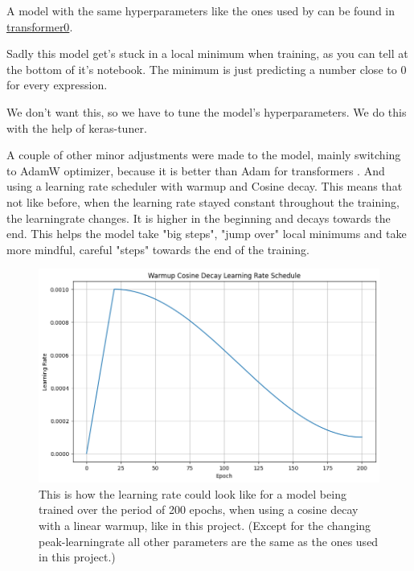 \documentclass{article}
\begin{document}
A model with the same hyperparameters like the ones used by \cite{vaswani2023attentionneed} 
can be found in \href{https://github.com/AntonStantan/matura/blob/main/transformer/transformer0.ipynb}
{transformer0}.

Sadly this model get's stuck in a local minimum when training, as you can 
tell at the bottom of it's notebook. The minimum is just predicting a number 
close to 0 for every expression.

We don't want this, so we have to tune the model's hyperparameters.
We do this with the help of keras-tuner. 

A couple of other minor adjustments were made to the model, mainly switching to 
AdamW optimizer, because it is better than Adam for transformers \cite{loshchilov2019decoupledweightdecayregularization}. 
And using a learning rate scheduler with warmup and Cosine decay. This means 
that not like before, when the learning rate stayed constant throughout the 
training, the learningrate changes. It is higher in the beginning and decays 
towards the end. This helps the model take "big steps", "jump over" local 
minimums and take more mindful, careful "steps" towards the end of the training. 

\begin{figure}[htbp]
    \centering
    \includegraphics[width=0.5\paperwidth]{images/learningRate.png}
    \caption{This is how the learning rate could look like for a model being 
    trained over the period of 200 epochs, when using a cosine decay with a 
    linear warmup, like in this project. (Except for the changing 
    peak-learningrate all other parameters are the same as the ones used in 
    this project.)}
    \label{fig:learningrate}
\end{figure}
\end{document}
